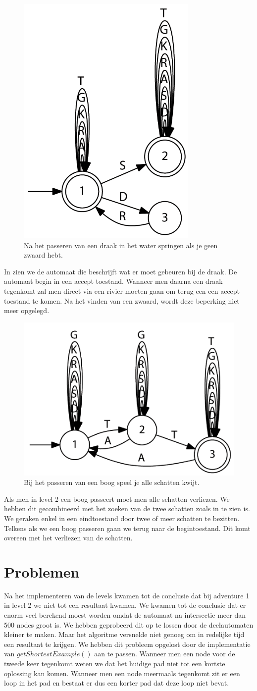 \documentclass[a4paper, 11pt]{article}
\begin{document}
		\begin{figure}[H]
			\centering
			\includegraphics[width=0.3\linewidth]{draak}
			\caption{Na het passeren van een draak in het water springen als je geen zwaard hebt.}
			\label{fig:draak}
		\end{figure}
	
		In  zien we de automaat die beschrijft wat er moet gebeuren bij de draak. De automaat begin in een accept toestand. Wanneer men daarna een draak tegenkomt zal men direct via een rivier moeten gaan om terug een een accept toestand te komen. Na het vinden van een zwaard, wordt deze beperking niet meer opgelegd.
			
		
		\begin{figure}[H]
			\centering
			\includegraphics[width=0.4\linewidth]{boog}
			\caption{Bij het passeren van een boog speel je alle schatten kwijt.}
			\label{fig:boog}
		\end{figure}
		
		Als men in level 2 een boog passeert moet men alle schatten verliezen. We hebben dit gecombineerd met het zoeken van de twee schatten zoals in  te zien is. We geraken enkel in een eindtoestand door twee of meer schatten te bezitten. Telkens als we een boog passeren gaan we terug naar de begintoestand. Dit komt overeen met het verliezen van de schatten.
	
	\section{Problemen}
		Na het implementeren van de levels kwamen tot de conclusie dat bij adventure 1 in level 2 we niet tot een resultaat kwamen. We kwamen tot de conclusie dat er enorm veel berekend moest worden omdat de automaat na intersectie meer dan 500 nodes groot is. We hebben geprobeerd dit op te lossen door de deelautomaten kleiner te maken. Maar het algoritme versnelde niet genoeg om in redelijke tijd een resultaat te krijgen. We hebben dit probleem opgelost door de implementatie van $getShortestExample()$ aan te passen. Wanneer men een node voor de tweede keer tegenkomt weten we dat het huidige pad niet tot een kortste oplossing kan komen. Wanneer men een node meermaals tegenkomt zit er een loop in het pad en bestaat er dus een korter pad dat deze loop niet bevat.
	
	
	
	
	
	
	
	
	
	
	
\end{document}
